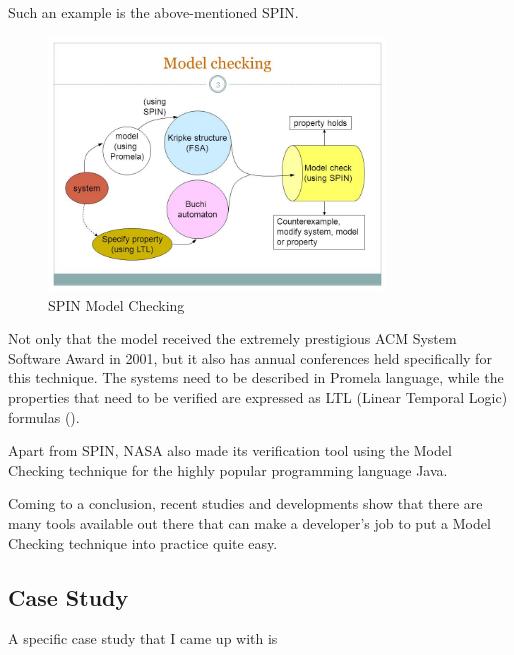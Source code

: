 \documentclass[paper=a4, fontsize=11pt]{scrartcl} %
\numberwithin{equation}{section} %
\numberwithin{figure}{section} %
\numberwithin{table}{section} %
\begin{document}
Such an example is the above-mentioned SPIN.

\begin{figure}[!ht]
    \centering
    \includegraphics[width=0.8\textwidth]{spin.jpg}
    \caption{SPIN Model Checking}
\end{figure}

Not only that the model received the extremely prestigious ACM System Software Award in 2001, but it also has annual conferences held specifically for this technique. The systems need to be described in Promela language, while the properties that need to be verified are expressed as LTL (Linear Temporal Logic) formulas (\citet{spin}). \\

\par 
Apart from SPIN, NASA also made its verification tool using the Model Checking technique for the highly popular programming language Java. \\

\par
Coming to a conclusion, recent studies and developments show that there are many tools available out there that can make a developer's job to put a Model Checking technique into practice quite easy.


\subsection{Case Study}

\par
A specific case study that I came up with is 

\end{document}
